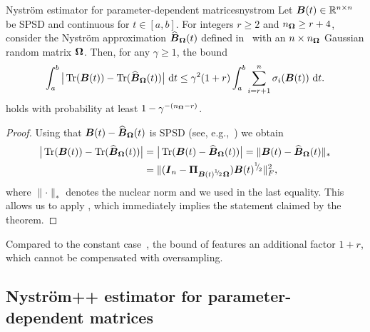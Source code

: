 \begin{theorem}{Nyström estimator for parameter-dependent matrices}{nystrom}
    Let $\boldsymbol{B}(t) \in \mathbb{R}^{n \times n}$ be SPSD and continuous for $t \in [a, b]$. For integers $r \geq 2$ and $n_{\boldsymbol{\Omega}} \geq r + 4$, consider the Nystr\"om approximation $\widehat{\boldsymbol{B}}_{\boldsymbol{\Omega}}(t)$ defined in~ with an $n\times n_{\boldsymbol{\Omega}}$ Gaussian random matrix $\boldsymbol{\Omega}$. Then, for any $\gamma \geq 1$, the bound 
    \[
        \int_{a}^{b} \big| \operatorname{Tr}(\boldsymbol{B}(t)) - \operatorname{Tr}(\widehat{\boldsymbol{B}}_{\boldsymbol{\Omega}}(t)) \big| ~\mathrm{d}t
        \leq \gamma^2 (1 + r) \int_{a}^{b} \sum_{i = r+1}^{n} \sigma_i(\boldsymbol{B}(t)) ~\mathrm{d}t.
    \]
    holds with probability at least $1 - \gamma^{-(n_{\boldsymbol{\Omega}} - r)}$.
\end{theorem}
\begin{proof}
Using that $\boldsymbol{B}(t) - \widehat{\boldsymbol{B}}_{\boldsymbol{\Omega}}(t)$ is SPSD (see, e.g.,~\cite[Lemma 2.1]{frangella-2023-randomized-nystrom}) we obtain
    \begin{align*}
        \big| \operatorname{Tr}(\boldsymbol{B}(t)) - \operatorname{Tr}(\widehat{\boldsymbol{B}}_{\boldsymbol{\Omega}}(t)) \big|
        & = \big| \operatorname{Tr}(\boldsymbol{B}(t) - \widehat{\boldsymbol{B}}_{\boldsymbol{\Omega}}(t)) \big|
        = \lVert \boldsymbol{B}(t) - \widehat{\boldsymbol{B}}_{\boldsymbol{\Omega}}(t) \rVert _{\ast} \\
        & = \lVert (\boldsymbol{I}_n - \boldsymbol{\Pi}_{\boldsymbol{B}(t)^{{}^{1}{\mskip -5mu/\mskip -3mu}_{2}} \boldsymbol{\Omega}}) \boldsymbol{B}(t)^{{}^{1}{\mskip -5mu/\mskip -3mu}_{2}} \rVert _F^2,
    \end{align*}
    where $\lVert \cdot \rVert _{\ast}$ denotes the nuclear norm and we used \cite[Theorem 1]{gittens-2011-spectral-norm} in the last equality. This allows us to apply \cite[Theorem 5]{kressner-2024-randomized-lowrank}, which immediately implies the statement claimed by the theorem.
\end{proof}

Compared to the constant case~\cite[Theorem 8.1]{tropp-2023-randomized-algorithms}, the bound of  features an additional factor $1+r$, which cannot be compensated with oversampling.

\subsection{Nyström++ estimator for parameter-dependent matrices}
\label{subsec:nystrom-pp}


